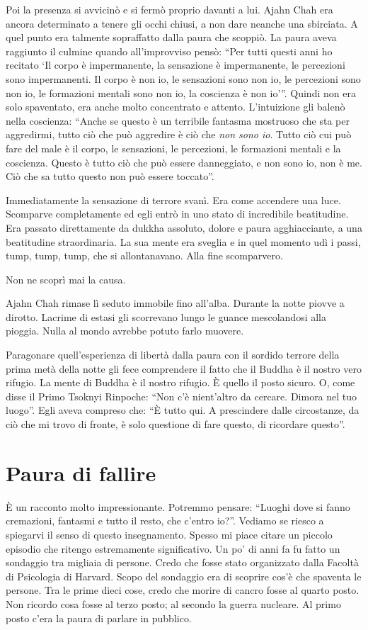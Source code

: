 Poi la presenza si avvicinò e si fermò proprio davanti a lui. Ajahn Chah era ancora determinato a tenere gli occhi chiusi, a non dare neanche una sbirciata. A quel punto era talmente sopraffatto dalla paura che scoppiò. La paura aveva raggiunto il culmine quando all'improvviso pensò: ``Per tutti questi anni ho recitato `Il corpo è impermanente, la sensazione è impermanente, le percezioni sono impermanenti. Il corpo è non io, le sensazioni sono non io, le percezioni sono non io, le formazioni mentali sono non io, la coscienza è non io'\thinspace''. Quindi non era solo spaventato, era anche molto concentrato e attento. L'intuizione gli balenò nella coscienza: ``Anche se questo è un terribile fantasma mostruoso che sta per aggredirmi, tutto ciò che può aggredire è ciò che \textit{non sono io}. Tutto ciò cui può fare del male è il corpo, le sensazioni, le percezioni, le formazioni mentali e la coscienza. Questo è tutto ciò che può essere danneggiato, e non sono io, non è me. Ciò che sa tutto questo non può essere toccato''.

Immediatamente la sensazione di terrore svanì. Era come accendere una luce. Scomparve completamente ed egli entrò in uno stato di incredibile beatitudine. Era passato direttamente da dukkha assoluto, dolore e paura agghiacciante, a una beatitudine straordinaria. La sua mente era sveglia e in quel momento udì i passi, tump, tump, tump, che si allontanavano. Alla fine scomparvero.

Non ne scoprì mai la causa.

Ajahn Chah rimase lì seduto immobile fino all'alba. Durante la notte piovve a dirotto. Lacrime di estasi gli scorrevano lungo le guance mescolandosi alla pioggia. Nulla al mondo avrebbe potuto farlo muovere.

Paragonare quell'esperienza di libertà dalla paura con il sordido terrore della prima metà della notte gli fece comprendere il fatto che il Buddha è il nostro vero rifugio. La mente di Buddha è il nostro rifugio. È quello il posto sicuro. O, come disse il Primo Tsoknyi Rinpoche: ``Non c'è nient'altro da cercare. Dimora nel tuo luogo''. Egli aveva compreso che: ``È tutto qui. A prescindere dalle circostanze, da ciò che mi trovo di fronte, è solo questione di fare questo, di ricordare questo''.

\section*{Paura di fallire}

È un racconto molto impressionante. Potremmo pensare: ``Luoghi dove si fanno cremazioni, fantasmi e tutto il resto, che c'entro io?''. Vediamo se riesco a spiegarvi il senso di questo insegnamento. Spesso mi piace citare un piccolo episodio che ritengo estremamente significativo. Un po' di anni fa fu fatto un sondaggio tra migliaia di persone. Credo che fosse stato organizzato dalla Facoltà di Psicologia di Harvard. Scopo del sondaggio era di scoprire cos'è che spaventa le persone. Tra le prime dieci cose, credo che morire di cancro fosse al quarto posto. Non ricordo cosa fosse al terzo posto; al secondo la guerra nucleare. Al primo posto c'era la paura di parlare in pubblico. 

